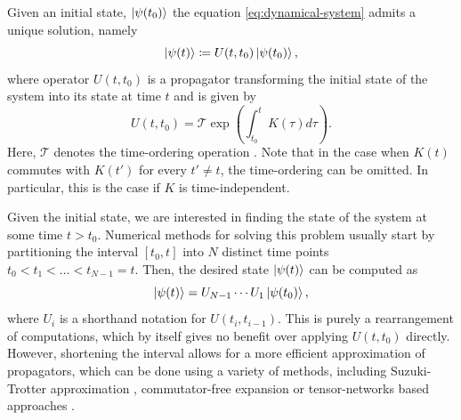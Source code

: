 Given an initial state, $\ket{\psi(t_0)}$ the equation
\eqref{eq:dynamical-system} admits a unique solution, namely
\begin{equation}
  \ket{\psi(t)} \coloneqq U(t, t_0) \ket{\psi(t_0)},
\end{equation}
where operator $U(t, t_0)$ is a propagator transforming the initial state of
the system into its state at time $t$ and is given by
\begin{equation}
  \label{eq:propagator}
  U(t, t_0) = \mathcal{T} \exp \left( \int_{t_0}^t K(\tau)d\tau \right).
\end{equation}
Here, $\mathcal{T}$ denotes the time-ordering operation \cite{chronological}.
Note that in the case when $K(t)$ commutes with $K(t')$ for every $t' \ne t$,
the time-ordering can be omitted. In particular, this is the case if $K$ is
time-independent.

Given the initial state, we are interested in finding the state of the system
at some time $t > t_0$. Numerical methods for solving this problem usually
start by partitioning the interval $[t_0, t]$ into $N$ distinct time points
$t_0 < t_1 < \ldots < t_{N-1} = t$. Then, the desired state $\ket{\psi(t)}$ can
be computed as
%
\begin{equation}
  \ket{\psi(t)} = U_{N-1} \cdots U_1 \ket{\psi(t_0)},
\end{equation}
%
where $U_i$ is a shorthand notation for $U(t_i, t_{i-1})$. This is purely a
rearrangement of computations, which by itself gives no benefit over applying
$U(t, t_0)$ directly. However, shortening the interval allows for a more
efficient approximation of propagators, which can be done using a variety of
methods, including Suzuki-Trotter approximation \cite{suzuki}, commutator-free
expansion \cite{commutatorfree} or tensor-networks based approaches
\cite{dmrg}.


